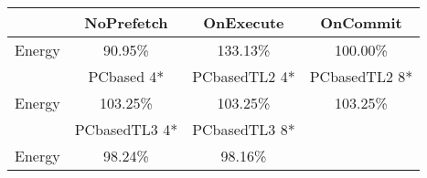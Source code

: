 \begin{tabular}{ l|ccc }
 & NoPrefetch & OnExecute & OnCommit\\ \hline
Energy
 & 90.95\% & 133.13\% & 100.00\%\\ \hline
\hline
 & PCbased 4* & PCbasedTL2 4* & PCbasedTL2 8*\\ \hline
Energy
 & 103.25\% & 103.25\% & 103.25\%\\ \hline
\hline
 & PCbasedTL3 4* & PCbasedTL3 8*&\\ \hline
Energy
 & 98.24\% & 98.16\%&\\ \hline
\end{tabular}

